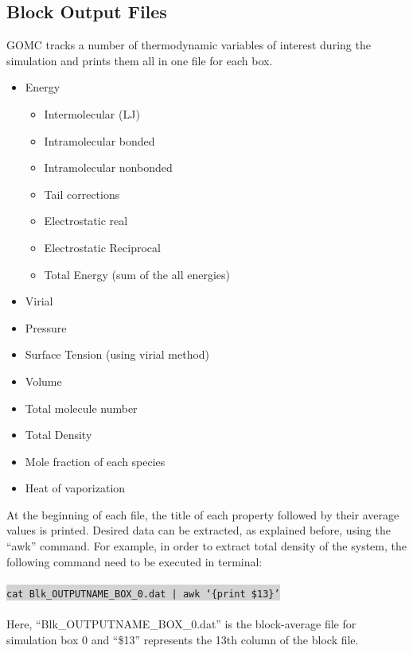 \subsection{Block Output Files}
GOMC tracks a number of thermodynamic variables of interest during the simulation and prints them all in one file for each box.
\begin{itemize}
\item Energy
	\begin{itemize}
	\item Intermolecular (LJ)
	\item Intramolecular bonded
	\item Intramolecular nonbonded
	\item Tail corrections
	\item Electrostatic real
	\item Electrostatic Reciprocal
	\item Total Energy (sum of the all energies)
	\end{itemize}
\item Virial
\item Pressure 
\item Surface Tension (using virial method)
\item Volume
\item Total molecule number
\item Total Density
\item Mole fraction of each species
\item Heat of vaporization
\end{itemize}
At the beginning of each file, the title of each property followed by their average values is printed. Desired data can be extracted, as explained before, using the ``awk'' command. For example, in order to extract total density of the system, the following command need to be executed in terminal:\\\\
\colorbox{lightgray}{
\texttt{cat Blk\_OUTPUTNAME\_BOX\_0.dat | awk `\{{print \$13}\}'}
}\\\\
Here, ``Blk\_OUTPUTNAME\_BOX\_0.dat'' is the block-average file for simulation box 0 and ``\$13'' represents the 13th column of the block file.
